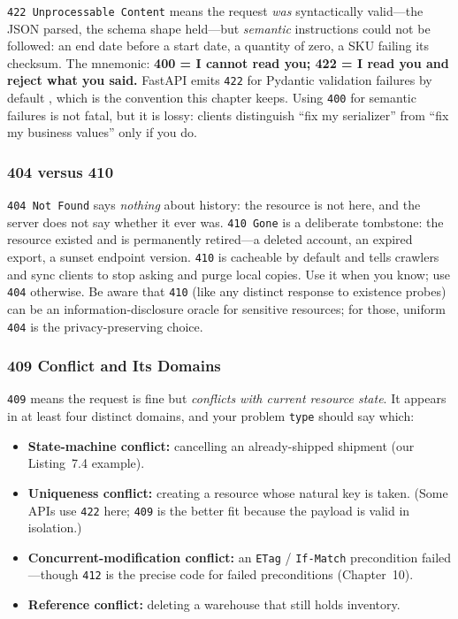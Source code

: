 \texttt{422 Unprocessable Content} means the request \emph{was} syntactically
valid---the JSON parsed, the schema shape held---but \emph{semantic}
instructions could not be followed: an end date before a start date, a
quantity of zero, a SKU failing its checksum. The mnemonic:
\textbf{400 = I cannot read you; 422 = I read you and reject what you said.}
FastAPI emits \texttt{422} for Pydantic validation failures by default
\cite{fastapidocs}, which is the convention this chapter keeps. Using
\texttt{400} for semantic failures is not fatal, but it is lossy: clients
distinguish ``fix my serializer'' from ``fix my business values'' only if
you do.

\subsubsection{404 versus 410}

\texttt{404 Not Found} says \emph{nothing} about history: the resource is not
here, and the server does not say whether it ever was. \texttt{410 Gone} is a
deliberate tombstone: the resource existed and is permanently retired---a
deleted account, an expired export, a sunset endpoint version. \texttt{410}
is cacheable by default and tells crawlers and sync clients to stop asking
and purge local copies. Use it when you know; use \texttt{404} otherwise.
Be aware that \texttt{410} (like any distinct response to existence probes)
can be an information-disclosure oracle for sensitive resources; for those,
uniform \texttt{404} is the privacy-preserving choice.

\subsubsection{409 Conflict and Its Domains}

\texttt{409} means the request is fine but \emph{conflicts with current
resource state}. It appears in at least four distinct domains, and your
problem \texttt{type} should say which:

\begin{itemize}
  \item \textbf{State-machine conflict:} cancelling an already-shipped
        shipment (our Listing~7.4 example).
  \item \textbf{Uniqueness conflict:} creating a resource whose natural key
        is taken. (Some APIs use \texttt{422} here; \texttt{409} is the
        better fit because the payload is valid in isolation.)
  \item \textbf{Concurrent-modification conflict:} an \texttt{ETag} /
        \texttt{If-Match} precondition failed---though \texttt{412} is the
        precise code for failed preconditions (Chapter~10).
  \item \textbf{Reference conflict:} deleting a warehouse that still holds
        inventory.
\end{itemize}

